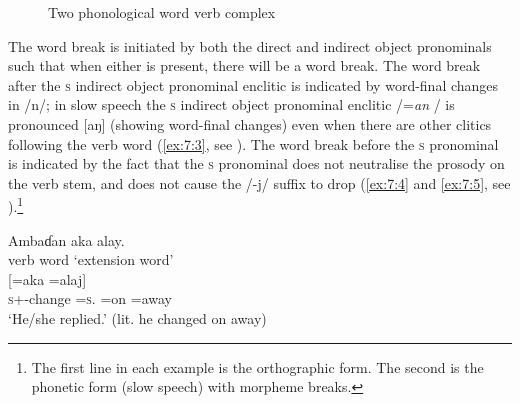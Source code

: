 \begin{figure}
\caption{Two phonological word verb complex\label{fig:7.2}\label{fig:12}}
\end{figure}

The word break is initiated by both the direct and indirect object pronominals such that when either is present, there will be a word break. The word break after the \textsc{s} indirect object pronominal enclitic is indicated by word-final changes in /n/; in slow speech the \textsc{s} indirect object pronominal enclitic /=\textit{an }/ is pronounced [aŋ] (showing word-final changes) even when there are other clitics following the verb word (\ref{ex:7:3}, see ).  The word break before the \textsc{s} \DO pronominal is indicated by the fact that the \textsc{s} \DO pronominal does not neutralise the prosody on the verb stem, and does not cause the  /-j/ suffix to drop (\ref{ex:7:4} and \ref{ex:7:5}, see ).\footnote{The first line in each example is the orthographic form. The second is the phonetic form (slow speech) with morpheme breaks.} 


\ea\label{ex:7:3}
Ambaɗan  aka  alay.\\
verb word   \hspace{50pt}  ‘extension word’\\
\gll [à-mbaɗ  =aŋ] \hspace{5pt} [=aka  =alaj]\\
\textsc{s}+{\PFV}-change =\textsc{s}.{\IO} \hspace{5pt}  =on   =away\\
\glt ‘He/she replied.’ (lit. he changed on away)
\z

